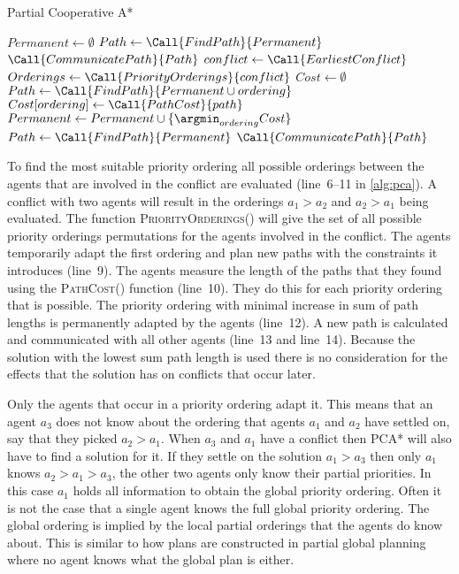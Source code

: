 \begin{algorithm}[t]
    \caption{Partial Cooperative A*}
    \label{alg:pca}
    \begin{algorithmic}[1]
        \State $Permanent \gets \emptyset$
        \State $Path \gets \Call{FindPath}{Permanent}$
        \State $\Call{CommunicatePath}{Path}$
        \State $conflict \gets \Call{EarliestConflict}$
        \State $Orderings \gets \Call{PriorityOrderings}{conflict}$ 
        \State $Cost \gets \emptyset$
        \State $Path \gets \Call{FindPath}{Permanent \cup ordering}$
        \State $Cost[ordering] \gets \Call{PathCost}{path}$
        \EndFor
        \State $Permanent \gets Permanent \cup \{ \argmin_{ordering}{Cost} \}$
        \State $Path \gets \Call{FindPath}{Permanent}$
        \State $\Call{CommunicatePath}{Path}$
        \EndWhile
    \end{algorithmic}
\end{algorithm}

To find the most suitable priority ordering all possible orderings
between the agents that are involved in the conflict are evaluated (line~6--11 
in \autoref{alg:pca}). A conflict with two agents will result in the orderings 
$a_1 > a_2$ and $a_2 > a_1$ being evaluated. The function 
\textsc{PriorityOrderings()} will give the set of all possible priority 
orderings 
permutations for the agents involved in the conflict. The agents temporarily 
adapt 
the 
first ordering and plan new paths with the constraints it introduces (line~9). 
The agents measure the length of the paths that they found using the 
\textsc{PathCost()} function (line~10). They do 
this for each priority ordering that is possible. The priority ordering with 
minimal increase in sum of path lengths is permanently adapted by the 
agents (line~12). A new path is calculated and communicated with all other 
agents (line~13 and line~14). Because the solution with the lowest sum path 
length is used there is no consideration for the effects that the solution has 
on conflicts that occur later.

Only the agents that occur in a priority ordering adapt it. This means that an
agent $a_3$ does not know about the ordering that agents $a_1$ and $a_2$ have
settled on, say that they picked $a_2 > a_1$. When $a_3$ and $a_1$ have a
conflict then PCA* will also have to find a solution for it. If they settle on 
the
solution $a_1 > a_3$ then only $a_1$ knows $a_2 > a_1 > a_3$, the other two
agents only know their partial priorities. In this case $a_1$ holds all 
information to obtain the global priority ordering. Often it is not the 
case that a single agent knows the
full global priority ordering. The global ordering is implied by the local 
partial orderings that the agents do know about. This is similar to how plans 
are constructed in partial global planning where no agent knows what the global 
plan is either.


